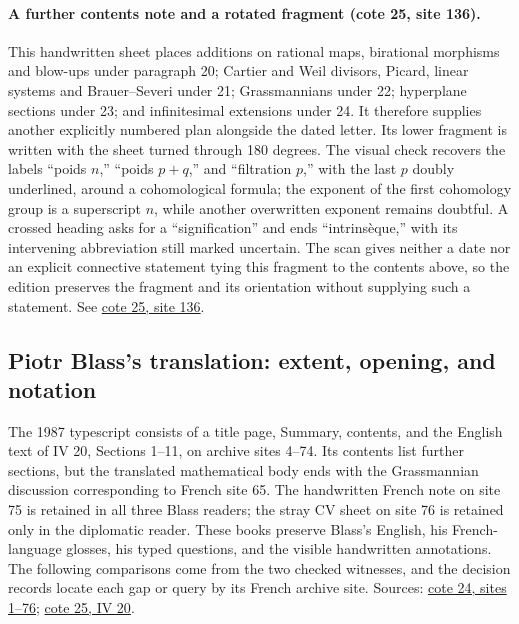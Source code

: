 \documentclass[10pt,a4paper]{article}
\begin{document}
\paragraph{A further contents note and a rotated fragment (cote 25, site 136).}
This handwritten sheet places additions on rational maps, birational morphisms and blow-ups under paragraph 20; Cartier and Weil divisors, Picard, linear systems and Brauer--Severi under 21; Grassmannians under 22; hyperplane sections under 23; and infinitesimal extensions under 24. It therefore supplies another explicitly numbered plan alongside the dated letter. Its lower fragment is written with the sheet turned through 180 degrees. The visual check recovers the labels ``poids $n$,'' ``poids $p+q$,'' and ``filtration $p$,'' with the last $p$ doubly underlined, around a cohomological formula; the exponent of the first cohomology group is a superscript $n$, while another overwritten exponent remains doubtful. A crossed heading asks for a ``signification'' and ends ``intrinsèque,'' with its intervening abbreviation still marked uncertain. The scan gives neither a date nor an explicit connective statement tying this fragment to the contents above, so the edition preserves the fragment and its orientation without supplying such a statement. See \href{https://grothendieck.umontpellier.fr/web/viewer.html?file=../25.pdf#page=137}{cote 25, site 136}.
\par{}

\par{}
\subsection*{Piotr Blass's translation: extent, opening, and notation}
The 1987 typescript consists of a title page, Summary, contents, and the English text of IV 20, Sections 1--11, on archive sites 4--74. Its contents list further sections, but the translated mathematical body ends with the Grassmannian discussion corresponding to French site 65. The handwritten French note on site 75 is retained in all three Blass readers; the stray CV sheet on site 76 is retained only in the diplomatic reader. These books preserve Blass's English, his French-language glosses, his typed questions, and the visible handwritten annotations. The following comparisons come from the two checked witnesses, and the decision records locate each gap or query by its French archive site. Sources: \href{https://grothendieck.umontpellier.fr/web/viewer.html?file=../24.pdf\#page=2}{cote 24, sites 1--76}; \href{https://grothendieck.umontpellier.fr/web/viewer.html?file=../25.pdf\#page=3}{cote 25, IV 20}.
\end{document}
